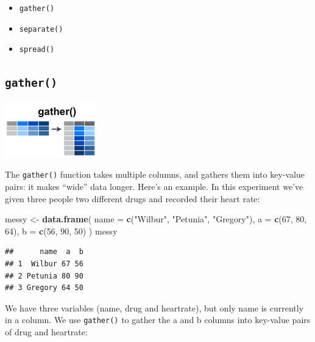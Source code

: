 \documentclass[]{book}
\newenvironment{Shaded}{\begin{snugshade}}{\end{snugshade}}
\newcommand{\DataTypeTok}[1]{\textcolor[rgb]{0.13,0.29,0.53}{#1}}
\newcommand{\DecValTok}[1]{\textcolor[rgb]{0.00,0.00,0.81}{#1}}
\newcommand{\KeywordTok}[1]{\textcolor[rgb]{0.13,0.29,0.53}{\textbf{#1}}}
\newcommand{\NormalTok}[1]{#1}
\newcommand{\StringTok}[1]{\textcolor[rgb]{0.31,0.60,0.02}{#1}}
\providecommand{\tightlist}{%
  \setlength{\itemsep}{0pt}\setlength{\parskip}{0pt}}
\begin{document}
\begin{itemize}
\tightlist
\item
  \texttt{gather()}
\item
  \texttt{separate()}
\item
  \texttt{spread()}
\end{itemize}

\hypertarget{gather}{%
\subsection*{\texorpdfstring{\texttt{gather()}}{gather()}}\label{gather}}

\includegraphics{./figures/tidyr-gather.png}

The \texttt{gather()} function takes multiple columns, and gathers them into key-value pairs: it makes ``wide'' data longer. Here's an example. In this experiment we've given three people two different drugs and recorded their heart rate:

\begin{Shaded}
\begin{Highlighting}[]
\NormalTok{messy <-}\StringTok{ }\KeywordTok{data.frame}\NormalTok{(}
  \DataTypeTok{name =} \KeywordTok{c}\NormalTok{(}\StringTok{"Wilbur"}\NormalTok{, }\StringTok{"Petunia"}\NormalTok{, }\StringTok{"Gregory"}\NormalTok{),}
  \DataTypeTok{a =} \KeywordTok{c}\NormalTok{(}\DecValTok{67}\NormalTok{, }\DecValTok{80}\NormalTok{, }\DecValTok{64}\NormalTok{),}
  \DataTypeTok{b =} \KeywordTok{c}\NormalTok{(}\DecValTok{56}\NormalTok{, }\DecValTok{90}\NormalTok{, }\DecValTok{50}\NormalTok{)}
\NormalTok{)}
\NormalTok{messy}
\end{Highlighting}
\end{Shaded}

\begin{verbatim}
##      name  a  b
## 1  Wilbur 67 56
## 2 Petunia 80 90
## 3 Gregory 64 50
\end{verbatim}

We have three variables (name, drug and heartrate), but only name is currently in a column. We use \texttt{gather()} to gather the a and b columns into key-value pairs of drug and heartrate:
\end{document}
